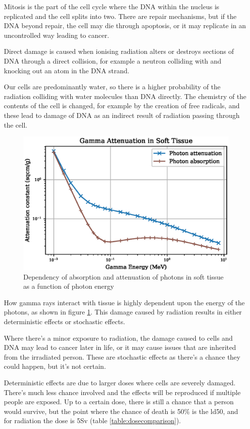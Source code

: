 Mitosis is the part of the cell cycle where the DNA within the nucleus is replicated and the cell splits into two.  There are repair mechanisms, but if the DNA beyond repair, the cell may die through apoptosis, or it may replicate in an uncontrolled way leading to cancer.

Direct damage is caused when ionising radiation alters or destroys sections of DNA through a direct collision, for example a neutron colliding with and knocking out an atom in the DNA strand.

Our cells are predominantly water, so there is a higher probability of the radiation colliding with water molecules than DNA directly.  The chemistry of the contents of the cell is changed, for example by the creation of free radicals, and these lead to damage of DNA as an indirect result of radiation passing through the cell.

\begin{figure}[htb]
\centering
\includegraphics[width=0.5\linewidth]{chapters/consequences_of_ionizing_radiation/tissue/soft_tissue_gamma_attenuation.eps}
\caption{Dependency of absorption and attenuation of photons in soft tissue as a function of photon energy}
\label{fig:softtissueattenuation}
\end{figure}

How gamma rays interact with tissue is highly dependent upon the energy of the photons, as shown in figure \ref{fig:softtissueattenuation}.  This damage caused by radiation results in either deterministic effects or stochastic effects.  

Where there's a minor exposure to radiation, the damage caused to cells and DNA may lead to cancer later in life, or it may cause issues that are inherited from the irradiated person.  These are stochastic effects as there's a chance they could happen, but it's not certain.

Deterministic effects are due to larger doses where cells are severely damaged.  There's much less chance involved and the effects will be reproduced if multiple people are exposed.  Up to a certain dose, there is still a chance that a person would survive, but the point where the chance of death is 50\% is the \gls{ld50}, and for radiation the dose is 5Sv (table \ref{table:dosecomparison}).

